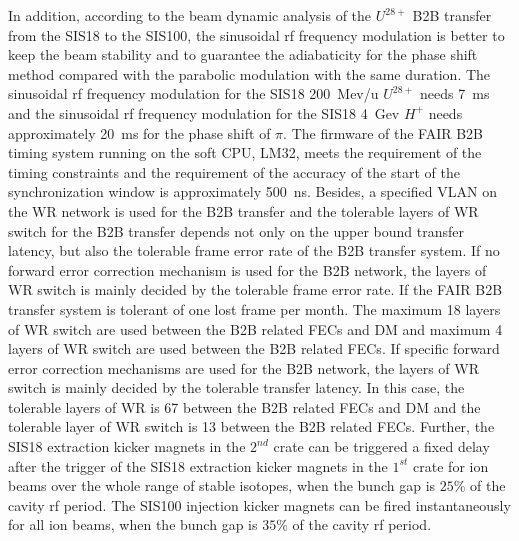 In addition, according to the beam dynamic analysis of the $U^{28+}$ B2B transfer from the SIS18 to the SIS100, the sinusoidal rf frequency modulation is better to keep the beam stability and to guarantee the adiabaticity for the phase shift method compared with the parabolic modulation with the same duration. The sinusoidal rf frequency modulation for the SIS18 \SI{200}{Mev/u} $U^{28+}$ needs \SI{7}{\ms} and the sinusoidal rf frequency modulation for the SIS18 \SI{4}{Gev} $H^{+}$ needs approximately \SI{20}{\ms} for the phase shift of $\pi$. The firmware of the FAIR B2B timing system running on the soft CPU, LM32, meets the requirement of the timing constraints and the requirement of the accuracy of the start of the synchronization window is approximately \SI{500}{\ns}. Besides, a specified VLAN on the WR network is used for the B2B transfer and the tolerable layers of WR switch for the B2B transfer depends not only on the upper bound transfer latency, but also the tolerable frame error rate of the B2B transfer system. If no forward error correction mechanism is used for the B2B network, the layers of WR switch is mainly decided by the tolerable frame error rate. If the FAIR B2B transfer system is tolerant of one lost frame per month. The maximum 18 layers of WR switch are used between the B2B related FECs and DM and maximum 4 layers of WR switch are used between the B2B related FECs. If specific forward error correction mechanisms are used for the B2B network, the layers of WR switch is mainly decided by the tolerable transfer latency. In this case, the tolerable layers of WR is 67 between the B2B related FECs and DM and the tolerable layer of WR switch is 13 between the B2B related FECs. Further, the SIS18 extraction kicker magnets in the $2^{nd}$ crate can be triggered a fixed delay after the trigger of the SIS18 extraction kicker magnets in the $1^{st}$ crate for ion beams over the whole range of stable isotopes, when the bunch gap is $25\%$ of the cavity rf period. The SIS100 injection kicker magnets can be fired instantaneously for all ion beams, when the bunch gap is $35\%$ of the cavity rf period.



